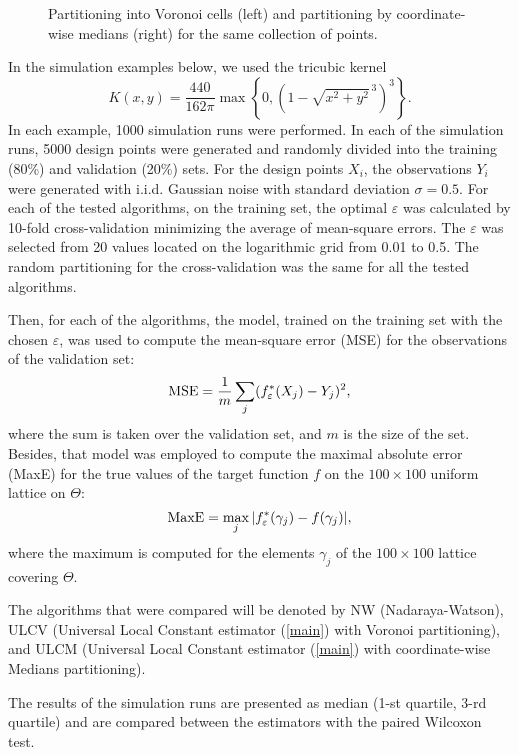 \documentclass[12pt]{article}
\theoremstyle{remark}
\begin{document}
\begin{figure}[!h]
    \centering
    \vspace{-12pt}
    \caption{Partitioning into Voronoi cells (left) and partitioning by coordinate-wise medians (right) for the same collection of points.}  \label{partfig}
\end{figure}

In the simulation examples below, we used the tricubic kernel
$$K(x,y)=\frac{440}{162\pi} \max\left\{0, \left(1-\sqrt{x^2+y^2}^{\,3}\right)^3\right\}.$$
In each example, 1000 simulation runs were performed. In each of the simulation runs, 5000 design points were generated and randomly divided into the training (80\%) and validation (20\%) sets.
For the design points $X_i$, the observations $Y_i$ were generated with i.i.d. Gaussian noise with standard deviation $\sigma=0.5$.
For each of the tested algorithms, on the training set, the optimal $\varepsilon$ was calculated by 10-fold cross-validation minimizing the average of mean-square errors.
The $\varepsilon$ was selected from 20 values located on the logarithmic grid from 0.01 to 0.5.
The random partitioning for the cross-validation was the same for all the tested algorithms.

Then, for each of the algorithms, the model, trained on the training set with the chosen $\varepsilon$, was used to compute the mean-square error (MSE) for the observations of the validation set:
$$ {\rm MSE} = \frac{1}{m} \sum_j (f^*_{\varepsilon}(X_j)-Y_j)^2,$$
where the sum is taken over the validation set, and $m$ is the size of the set.
Besides, that model was employed to compute the maximal absolute error (MaxE) for the true values of the target function $f$ on the $100\times 100$ uniform lattice on $\Theta$:
$$ {\rm MaxE} = \max_j |f^*_{\varepsilon}(\gamma_j)-f(\gamma_j)|,$$
where the maximum is computed for the elements $\gamma_j$ of the $100\times 100$ lattice covering $\Theta$.

The algorithms that were compared will be denoted by NW (Nadaraya-Watson), ULCV (Universal Local Constant estimator (\ref{main}) with Voronoi partitioning), and ULCM (Universal Local Constant estimator (\ref{main}) with coordinate-wise Medians partitioning).

The results of the simulation runs are presented as median (1-st quartile, 3-rd quartile) and are compared
between the estimators with the paired Wilcoxon test.
\end{document}
